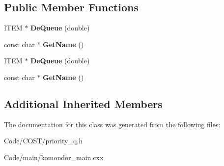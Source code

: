 \subsection*{Public Member Functions}
\begin{DoxyCompactItemize}
\item 
\mbox{\label{classErrorQueue_adddcd1d828ab3ebf9a1cc7c93e782f65}} 
I\+T\+EM $\ast$ {\bfseries De\+Queue} (double)
\item 
\mbox{\label{classErrorQueue_a49710709cb1587b947d9a68227e5ae65}} 
const char $\ast$ {\bfseries Get\+Name} ()
\item 
\mbox{\label{classErrorQueue_ad5d03f90704644d433f01a7162196e4b}} 
I\+T\+EM $\ast$ {\bfseries De\+Queue} (double)
\item 
\mbox{\label{classErrorQueue_adeb60b749886b6eaac7af352ee631d78}} 
const char $\ast$ {\bfseries Get\+Name} ()
\end{DoxyCompactItemize}
\subsection*{Additional Inherited Members}


The documentation for this class was generated from the following files\+:\begin{DoxyCompactItemize}
\item 
Code/\+C\+O\+S\+T/priority\+\_\+q.\+h\item 
Code/main/komondor\+\_\+main.\+cxx\end{DoxyCompactItemize}
